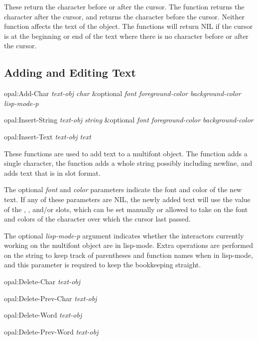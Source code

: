 These return the character before or after the cursor.  The function
 returns the character after the cursor, and
 returns the character before the cursor.  Neither function
affects the text of the object.  The functions will return {\sc NIL} if the cursor
is at the beginning or end of the text where there is no character before or
after the cursor.


\subsection{Adding and Editing Text}

\begin{programexample}
opal:Add-Char {\it text-obj  char} \&optional {\it font  foreground-color  background-color lisp-mode-p}\value{function}

opal:Insert-String {\it text-obj  string} \&optional {\it font  foreground-color  background-color}\value{function}

opal:Insert-Text {\it text-obj  text}\value{function}
\end{programexample}

These functions are used to add text to a multifont object.  The function
 adds a single character, the function  adds
a whole string possibly including newline, and  adds
text that is in  slot format.

The optional {\it font} and {\it color} parameters indicate the font and color
of the new text.  If any of these parameters are NIL, the newly added text
will use the value of the , , and/or
 slots, which can be set manually or allowed to take on
the font and colors of the character over which the cursor last passed.

The optional {\it lisp-mode-p} argument indicates whether the interactors
currently working on the multifont object are in lisp-mode.  Extra operations
are performed on the string to keep track of parentheses and function names
when in lisp-mode, and this parameter is required to keep the bookkeeping
straight.


\begin{programexample}
opal:Delete-Char {\it text-obj}\value{function}

opal:Delete-Prev-Char {\it text-obj}\value{function}

opal:Delete-Word {\it text-obj}\value{function}

opal:Delete-Prev-Word {\it text-obj}\value{function}
\end{programexample}

